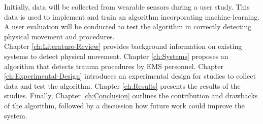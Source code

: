 Initially, data will be collected from wearable sensors during a user study. This data is used to implement and train an algorithm incorporating machine-learning. A user evaluation will be conducted to test the algorithm in correctly detecting physical movement and procedures.\\
Chapter \ref{ch:Literature-Review} provides background information on existing systems to detect physical movement. Chapter \ref{ch:Systems} proposes an algorithm that detects trauma procedures by \gls{EMS} personnel. Chapter \ref{ch:Experimental-Design} introduces an experimental design for studies to collect data and test the algorithm. Chapter \ref{ch:Results} presents the results of the studies. Finally, Chapter  \ref{ch:Conclusion} outlines the contribution and drawbacks of the algorithm, followed by a discussion how future work could improve the system. 